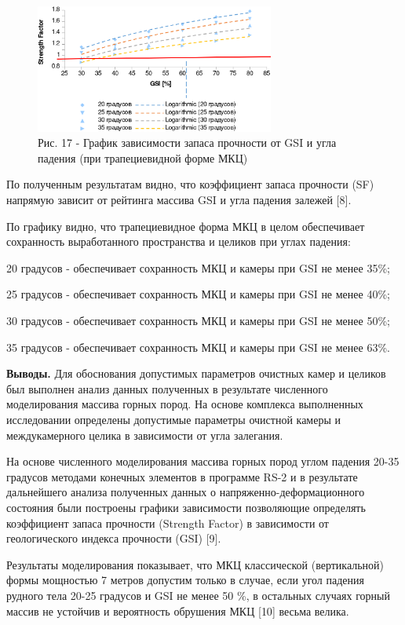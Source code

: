 \begin{figure}[H]
	\centering
	\includegraphics[width=0.7\textwidth]{assets/295.2}
	\caption*{Рис. 17 - График зависимости запаса прочности от GSI и угла падения (при трапециевидной форме МКЦ)}
\end{figure}

\begin{multicols}{2}
По полученным результатам видно, что коэффициент запаса прочности (SF)
напрямую зависит от рейтинга массива GSI и угла падения залежей {[}8{]}.

По графику видно, что трапециевидное форма МКЦ в целом обеспечивает
сохранность выработанного пространства и целиков при углах падения:

20 градусов - обеспечивает сохранность МКЦ и камеры при GSI не менее
35\%;

25 градусов - обеспечивает сохранность МКЦ и камеры при GSI не менее
40\%;

30 градусов - обеспечивает сохранность МКЦ и камеры при GSI не менее
50\%;

35 градусов - обеспечивает сохранность МКЦ и камеры при GSI не менее
63\%.

{\bfseries Выводы.} Для обоснования допустимых параметров очистных камер и
целиков был выполнен анализ данных полученных в результате численного
моделирования массива горных пород. На основе комплекса выполненных
исследовании определены допустимые параметры очистной камеры и
междукамерного целика в зависимости от угла залегания.

На основе численного моделирования массива горных пород углом падения
20-35 градусов методами конечных элементов в программе RS-2 и в
результате дальнейшего анализа полученных данных о
напряженно-деформационного состояния были построены графики зависимости
позволяющие определять коэффициент запаса прочности (Strength Factor) в
зависимости от геологического индекса прочности (GSI) {[}9{]}.

Результаты моделирования показывает, что МКЦ классической (вертикальной)
формы мощностью 7 метров допустим только в случае, если угол падения
рудного тела 20-25 градусов и GSI не менее 50 \%, в остальных случаях
горный массив не устойчив и вероятность обрушения МКЦ {[}10{]} весьма
велика.


\end{multicols}
